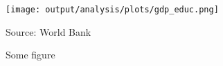 \begin{figure}
\caption{Some figure\label{fig:gdp_educ}}

\begin{centering}
\medskip{}
\par\end{centering}
\begin{centering}
\texttt{[image: output/analysis/plots/gdp\_educ.png]}\medskip{}
\par\end{centering}
{\footnotesize{}Source: World Bank}{\footnotesize\par}
\end{figure}


